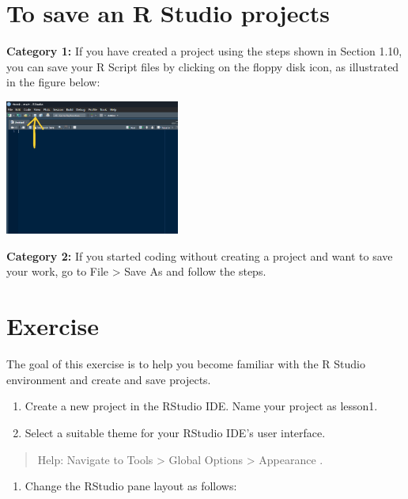 \documentclass[
  letterpaper,
  DIV=11,
  numbers=noendperiod]{scrreprt}
\providecommand{\tightlist}{%
  \setlength{\itemsep}{0pt}\setlength{\parskip}{0pt}}\usepackage{longtable,booktabs,array}
\begin{document}
\hypertarget{to-save-an-r-studio-projects}{%
\section{To save an R Studio
projects}\label{to-save-an-r-studio-projects}}

\textbf{Category 1:} If you have created a project using the steps shown
in Section 1.10, you can save your R Script files by clicking on the
floppy disk icon, as illustrated in the figure below:

\includegraphics[width=2.26in,height=\textheight]{img/chap1/rw13.png}

\textbf{Category 2:} If you started coding without creating a project
and want to save your work, go to File \textgreater{} Save As and follow
the steps.

\hypertarget{exercise}{%
\section{Exercise}\label{exercise}}

The goal of this exercise is to help you become familiar with the R
Studio environment and create and save projects.

\begin{enumerate}
\def\labelenumi{\arabic{enumi}.}
\item
  Create a new project in the RStudio IDE. Name your project as lesson1.
\item
  Select a suitable theme for your RStudio IDE's user interface.
\end{enumerate}

\begin{quote}
Help: Navigate to Tools \textgreater{} Global Options \textgreater{}
Appearance .
\end{quote}

\begin{enumerate}
\def\labelenumi{\arabic{enumi}.}
\setcounter{enumi}{2}
\tightlist
\item
  Change the RStudio pane layout as follows:
\end{enumerate}
\end{document}
